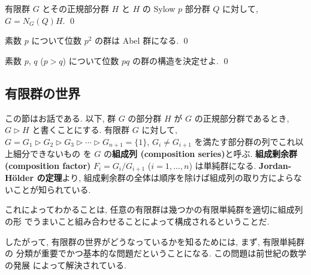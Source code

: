 \documentclass[12pt,twoside]{jarticle}
\def\nsup{\triangleright}
\begin{document}
\begin{question}[Frattini]
  有限群 $G$ とその正規部分群 $H$ と $H$ の Sylow $p$ 部分群 $Q$ に対して,
  $G = N_G(Q)H$. \qed
\end{question}

\begin{question}
  素数 $p$ について位数 $p^2$ の群は Abel 群になる. \qed
\end{question}

\begin{question}
  素数 $p$, $q$ ($p>q$) について位数 $pq$ の群の構造を決定せよ. \qed
\end{question}


\subsection{有限群の世界}
\label{sec:finite-group-world}

この節はお話である. 以下, 群 $G$ の部分群 $H$ が $G$ の正規部分群であるとき, 
$G\nsup H$ と書くことにする. 有限群 $G$ に対して, 
\( G = G_1 \nsup G_2 \nsup G_3 \nsup \cdots \nsup G_{n+1} = \{1\} \),
\( G_i \ne G_{i+1} \) %
を満たす部分群の列でこれ以上細分できないもの
を $G$ の{\bf 組成列 (composition series)}と呼ぶ.
{\bf 組成剰余群 (composition factor)} 
$F_i=G_i/G_{i+1}$ ($i=1,\dots,n$) は単純群になる.
{\bf Jordan-H\"older の定理}より, 
組成剰余群の全体は順序を除けば組成列の取り方によらないことが知られている.

これによってわかることは, 任意の有限群は幾つかの有限単純群を適切に組成列の形
でうまいこと組み合わせることによって構成されるということだ.

したがって, 有限群の世界がどうなっているかを知るためには, まず, 有限単純群の
分類が重要でかつ基本的な問題だということになる. この問題は前世紀の数学の発展
によって解決されている. 


\end{document}
